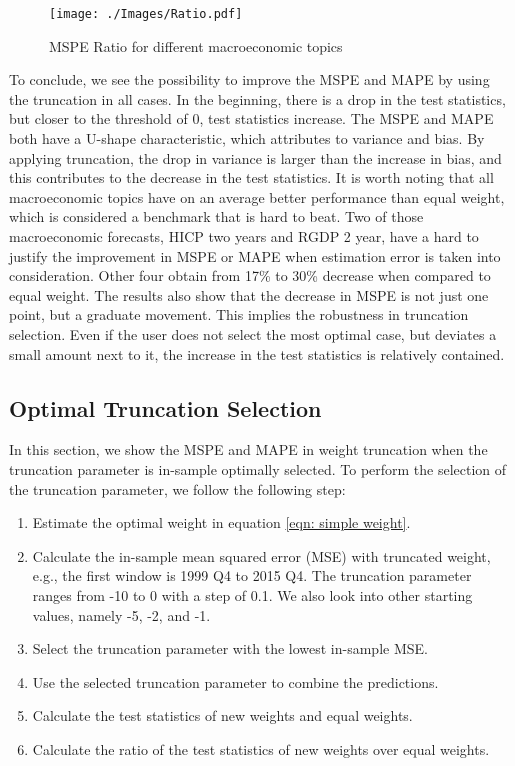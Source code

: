 \documentclass[11pt]{article}
\begin{document}
\begin{figure}[!h]
	\centering
	\texttt{[image: ./Images/Ratio.pdf]}
	\caption{MSPE Ratio for different macroeconomic topics}\label{fig: Ratio sub}
\end{figure}

To conclude, we see the possibility to improve the MSPE and MAPE by using the truncation in all cases. In the beginning, there is a drop in the test statistics, but closer to the threshold of 0, test statistics increase. The MSPE and MAPE both have a U-shape characteristic, which attributes to variance and bias. By applying truncation, the drop in variance is larger than the increase in bias, and this contributes to the decrease in the test statistics. It is worth noting that all macroeconomic topics have on an average better performance than equal weight, which is considered a benchmark that is hard to beat. Two of those  macroeconomic forecasts, HICP two years and RGDP 2 year, have a hard to justify the improvement in MSPE or MAPE when estimation error is taken into consideration. Other four obtain from 17\% to 30\% decrease when compared to equal weight. The results also show that the decrease in MSPE is not just one point, but a graduate movement. This implies the robustness in truncation selection. Even if the user does not select the most optimal case, but deviates a small amount next to it, the increase in the test statistics is relatively contained.

\subsection{Optimal Truncation Selection}\label{out-of-sample-truncation-selection}

In this section, we show the MSPE and MAPE in weight truncation when the truncation parameter is in-sample optimally selected. To perform the selection of the truncation parameter, we follow the following step:

\begin{enumerate}
	\def\labelenumi{\arabic{enumi}.}
	\item
	Estimate the optimal weight in equation \ref{eqn: simple weight}.
	\item
	Calculate the in-sample mean squared error (MSE) with truncated weight, e.g., the first window is 1999 Q4 to 2015 Q4. The truncation parameter ranges from -10 to 0 with a step of 0.1. We also look into other starting values, namely -5, -2, and -1.
	\item
	Select the truncation parameter with the lowest in-sample MSE.
	\item
	Use the selected truncation parameter to combine the predictions.
	\item
	Calculate the test statistics of new weights and equal weights.
	\item
	Calculate the ratio of the test statistics of new weights over equal weights.
\end{enumerate}
\end{document}
